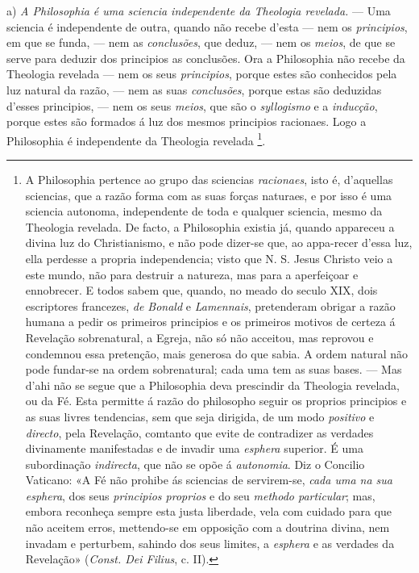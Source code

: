a) \emph{A Philosophia é uma sciencia independente da Theologia revelada.} --- Uma sciencia é independente de outra, quando não recebe d'esta --- nem os \emph{principios}, em que se funda, --- nem as \emph{conclusões}, que deduz, --- nem os \emph{meios}, de que se serve para deduzir dos principios as conclusões. Ora a Philosophia não recebe da Theologia revelada --- nem os seus \emph{principios}, porque estes são conhecidos pela luz natural da razão, --- nem as suas \emph{conclusões}, porque estas são deduzidas d'esses principios, --- nem os seus \emph{meios}, que são o \emph{syllogismo} e a \emph{inducção}, porque estes são formados á luz dos mesmos principios racionaes. Logo a Philosophia é independente da Theologia revelada \footnote{A Philosophia pertence ao grupo das sciencias \emph{racionaes}, isto é, d'aquellas sciencias, que a razão forma com as suas forças naturaes, e por isso é uma sciencia autonoma, independente de toda e qualquer sciencia, mesmo da Theologia revelada. De facto, a Philosophia existia já, quando appareceu a divina luz do Christianismo, e não pode dizer-se que, ao appa-recer d'essa luz, ella perdesse a propria independencia; visto que N. S. Jesus Christo veio a este mundo, não para destruir a natureza, mas para a aperfeiçoar e ennobrecer. E todos sabem que, quando, no meado do seculo XIX, dois escriptores francezes, \emph{de Bonald} e \emph{Lamennais}, pretenderam obrigar a razão humana a pedir os primeiros principios e os primeiros motivos de certeza á Revelação sobrenatural, a Egreja, não só não acceitou, mas reprovou e condemnou essa pretenção, mais generosa do que sabia. A ordem natural não pode fundar-se na ordem sobrenatural; cada uma tem as suas bases. --- Mas d'ahi não se segue que a Philosophia deva prescindir da Theologia revelada, ou da Fé. Esta permitte á razão do philosopho seguir os proprios principios e as suas livres tendencias, sem que seja dirigida, de um modo \emph{positivo} e \emph{directo}, pela Revelação, comtanto que evite de contradizer as verdades divinamente manifestadas e de invadir uma \emph{esphera} superior. É uma subordinação \emph{indirecta}, que não se opõe á \emph{autonomia}. Diz o Concilio Vaticano: «A Fé não prohibe ás sciencias de servirem-se, \emph{cada uma na sua esphera}, dos seus \emph{principios proprios} e do seu \emph{methodo particular}; mas, embora reconheça sempre esta justa liberdade, vela com cuidado para que não aceitem erros, mettendo-se em opposição com a doutrina divina, nem invadam e perturbem, sahindo dos seus limites, a \emph{esphera} e as verdades da Revelação» (\emph{Const. Dei Filius}, c. II).}.

